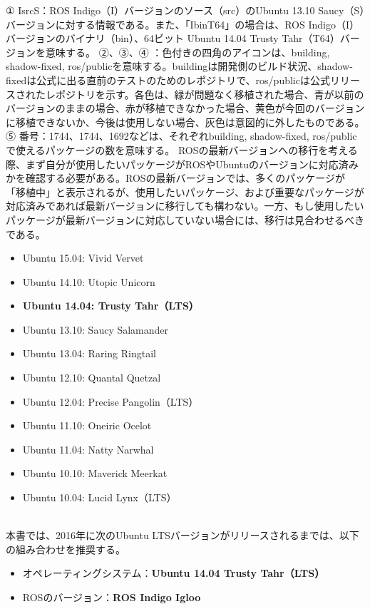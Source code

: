 ① IsrcS：ROS Indigo（I）バージョンのソース（src）のUbuntu 13.10 Saucy（S）バージョンに対する情報である。また、「IbinT64」の場合は、ROS Indigo（I）バージョンのバイナリ（bin）、64ビット Ubuntu 14.04 Trusty Tahr（T64）バージョンを意味する。
②、③、④ ：色付きの四角のアイコンは、building, shadow-fixed, ros/publicを意味する。buildingは開発側のビルド状況、shadow-fixedは公式に出る直前のテストのためのレポジトリで、ros/publicは公式リリースされたレポジトリを示す。各色は、緑が問題なく移植された場合、青が以前のバージョンのままの場合、赤が移植できなかった場合、黄色が今回のバージョンに移植できないか、今後は使用しない場合、灰色は意図的に外したものである。
⑤ 番号：1744、1744、1692などは、それぞれbuilding, shadow-fixed, ros/publicで使えるパッケージの数を意味する。
ROSの最新バージョンへの移行を考える際、まず自分が使用したいパッケージがROSやUbuntuのバージョンに対応済みかを確認する必要がある。ROSの最新バージョンでは、多くのパッケージが「移植中」と表示されるが、使用したいパッケージ、および重要なパッケージが対応済みであれば最新バージョンに移行しても構わない。一方、もし使用したいパッケージが最新バージョンに対応していない場合には、移行は見合わせるべきである。
\\
\begin{itemize}
\item Ubuntu 15.04: Vivid Vervet
\item Ubuntu 14.10: Utopic Unicorn
\item \textbf{Ubuntu 14.04: Trusty Tahr（LTS）}
\item Ubuntu 13.10: Saucy Salamander
\item Ubuntu 13.04: Raring Ringtail
\item Ubuntu 12.10: Quantal Quetzal
\item Ubuntu 12.04: Precise Pangolin（LTS）
\item Ubuntu 11.10: Oneiric Ocelot
\item Ubuntu 11.04: Natty Narwhal
\item Ubuntu 10.10: Maverick Meerkat
\item Ubuntu 10.04: Lucid Lynx（LTS）
\end{itemize}
\\
本書では、2016年に次のUbuntu LTSバージョンがリリースされるまでは、以下の組み合わせを推奨する。

\begin{itemize}
\item オペレーティングシステム：\textbf{Ubuntu 14.04 Trusty Tahr（LTS）}
\item ROSのバージョン：\textbf{ROS Indigo Igloo}
\end{itemize}


